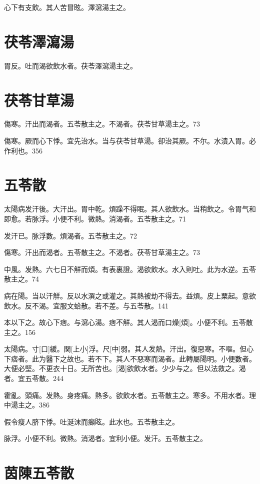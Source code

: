 \documentclass[12pt,twoside,UTF8,b5paper]{ctexbook}
\begin{document}
心下有支飲。其人苦冒眩。澤瀉湯主之。

\section{茯苓澤瀉湯}

胃反。吐而渴欲飲水者。茯苓澤瀉湯主之。

\section{茯苓甘草湯}

傷寒。汗出而渴者。五苓散主之。不渴者。茯苓甘草湯主之。73

傷寒。厥而心下悸。宜先治水。当与茯苓甘草湯。卻治其厥。不尔。水漬入胃。必作利也。356

\section{五苓散}

太陽病发汗後。大汗出。胃中乾。煩躁不得眠。其人欲飲水。当稍飲之。令胃气和即愈。若脉浮。小便不利。微熱。消渴者。五苓散主之。71

发汗已。脉浮數。煩渴者。五苓散主之。72

傷寒。汗出而渴者。五苓散主之。不渴者。茯苓甘草湯主之。73

中風。发熱。六七日不觧而煩。有表裏證。渴欲飲水。水入則吐。此为水逆。五苓散主之。74

病在陽。当以汗觧。反以水潠之或灌之。其熱被劫不得去。益煩。皮上粟起。意欲飲水。反不渴。宜服文蛤散。若不差。与五苓散。141

本以下之。故心下痞。与瀉心湯。痞不觧。其人渴而口燥[煩]。小便不利。五苓散主之。156

太陽病。寸[口]緩。関[上小]浮。尺[中]弱。其人发熱。汗出。復惡寒。不嘔。但心下痞者。此为醫下之故也。若不下。其人不惡寒而渴者。此轉屬陽明。小便數者。大便必堅。不更衣十日。无所苦也。[渴]欲飲水者。少少与之。但以法救之。渴者。宜五苓散。244

霍亂。頭痛。发熱。身疼痛。熱多。欲飲水者。五苓散主之。寒多。不用水者。理中湯主之。386

假令瘦人脐下悸。吐涎沫而癲眩。此水也。五苓散主之。

脉浮。小便不利。微熱。消渴者。宜利小便。发汗。五苓散主之。

\section{茵陳五苓散}
\end{document}
